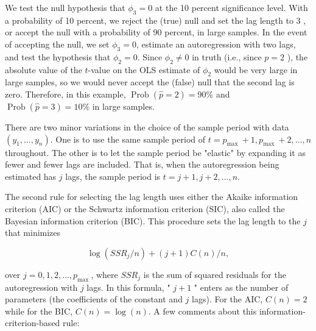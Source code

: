 \documentclass[10pt]{article}
\begin{document}
We test the null hypothesis that $\phi_{3}=0$ at the 10 percent significance level. With a probability of 10 percent, we reject the (true) null and set the lag length to 3 , or accept the null with a probability of 90 percent, in large samples. In the event of accepting the null, we set $\phi_{3}=0$, estimate an autoregression with two lags, and test the hypothesis that $\phi_{2}=0$. Since $\phi_{2} \neq 0$ in truth (i.e., since $p=2$ ), the absolute value of the $t$-value on the OLS estimate of $\phi_{2}$ would be very large in large samples, so we would never accept the (false) null that the second lag is zero. Therefore, in this example, $\operatorname{Prob}(\hat{p}=2)=90 \%$ and $\operatorname{Prob}(\hat{p}=3)=10 \%$ in large samples.

There are two minor variations in the choice of the sample period with data $\left(y_{1}, \ldots, y_{n}\right)$. One is to use the same sample period of $t=p_{\text {max }}+1, p_{\text {max }}+2, \ldots, n$\\
throughout. The other is to let the sample period be "elastic" by expanding it as fewer and fewer lags are included. That is, when the autoregression being estimated has $j$ lags, the sample period is $t=j+1, j+2, \ldots, n$.

The second rule for selecting the lag length uses either the Akaike information criterion (AIC) or the Schwartz information criterion (SIC), also called the Bayesian information criterion (BIC). This procedure sets the lag length to the $j$ that minimizes


\begin{equation*}
\log \left(S S R_{j} / n\right)+(j+1) C(n) / n, \tag{6.4.7}
\end{equation*}


over $j=0,1,2, \ldots, p_{\text {max }}$, where $S S R_{j}$ is the sum of squared residuals for the autoregression with $j$ lags. In this formula, " $j+1$ " enters as the number of parameters (the coefficients of the constant and $j$ lags). For the AIC, $C(n)=2$ while for the BIC, $C(n)=\log (n)$. A few comments about this information-criterion-based rule:
\end{document}
